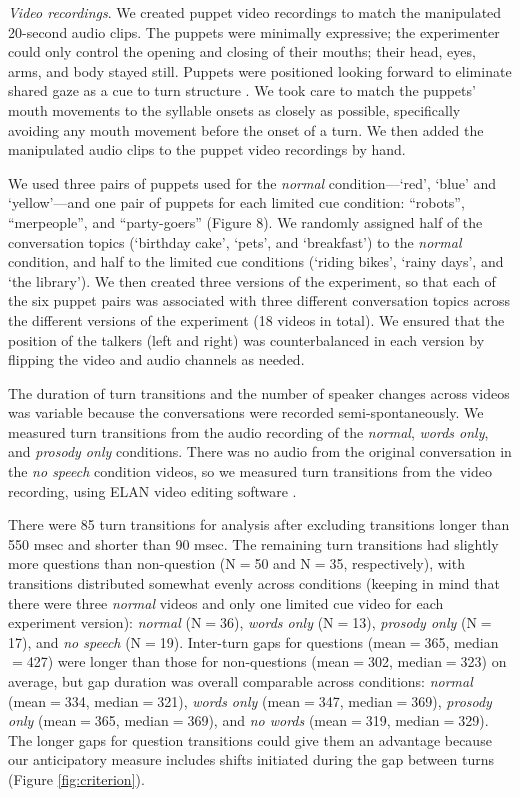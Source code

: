 \documentclass[authoryear, 12pt]{elsarticle}
\begin{document}
\textit{Video recordings}. We created puppet video recordings to match the manipulated 20-second audio clips. The puppets were minimally expressive; the experimenter could only control the opening and closing of their mouths; their head, eyes, arms, and body stayed still. Puppets were positioned looking forward to eliminate shared gaze as a cue to turn structure \citep{thorgrimsson2015}. We took care to match the puppets' mouth movements to the syllable onsets as closely as possible, specifically avoiding any mouth movement before the onset of a turn. We then added the manipulated audio clips to the puppet video recordings by hand.

We used three pairs of puppets used for the \textit{normal} condition---`red', `blue' and `yellow'---and one pair of puppets for each limited cue condition: ``robots'', ``merpeople'', and ``party-goers'' (Figure 8). We randomly assigned half of the conversation topics (`birthday cake', `pets', and `breakfast') to the \textit{normal} condition, and half to the limited cue conditions (`riding bikes', `rainy days', and `the library'). We then created three versions of the experiment, so that each of the six puppet pairs was associated with three different conversation topics across the different versions of the experiment (18 videos in total). We ensured that the position of the talkers (left and right) was counterbalanced in each version by flipping the video and audio channels as needed.

The duration of turn transitions and the number of speaker changes across videos was variable because the conversations were recorded semi-spontaneously. We measured turn transitions from the audio recording of the \textit{normal}, \textit{words only}, and \textit{prosody only} conditions. There was no audio from the original conversation in the \textit{no speech} condition videos, so we measured turn transitions from the video recording, using ELAN video editing software \citep{ELAN}. 

There were 85 turn transitions for analysis after excluding transitions longer than 550 msec and shorter than 90 msec. The remaining turn transitions had slightly more questions than non-question (N$=$50 and N$=$35, respectively), with transitions distributed somewhat evenly across conditions (keeping in mind that there were three \textit{normal} videos and only one limited cue video for each experiment version): \textit{normal} (N$=$36), \textit{words only} (N$=$13), \textit{prosody only} (N$=$17), and \textit{no speech} (N$=$19). Inter-turn gaps for questions (mean$=$365, median$=$427) were longer than those for non-questions (mean$=$302, median$=$323) on average, but gap duration was overall comparable across conditions: \textit{normal} (mean$=$334, median$=$321), \textit{words only} (mean$=$347, median$=$369), \textit{prosody only} (mean$=$365, median$=$369), and \textit{no words} (mean$=$319, median$=$329). The longer gaps for question transitions could give them an advantage because our anticipatory measure includes shifts initiated during the gap between turns (Figure \ref{fig:criterion}).
\end{document}
